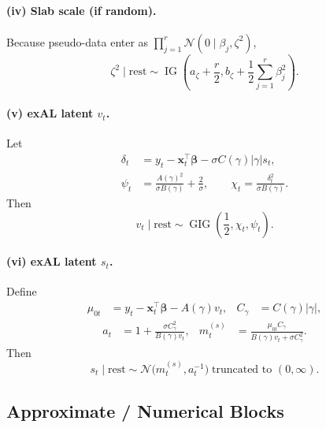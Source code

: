 \documentclass[11pt]{article}
\newcommand{\N}{\mathcal{N}}
\newcommand{\vect}[1]{\bm{#1}}
\DeclareMathOperator{\IG}{IG}
\DeclareMathOperator{\GIG}{GIG}
\begin{document}
\paragraph{(iv) Slab scale (if random).}
Because pseudo-data enter as
$\prod_{j=1}^r \N(0\mid\beta_j,\zeta^2)$,
\begin{equation}
  \zeta^2\mid\text{rest}
  \sim
  \IG\!\left(
    a_\zeta + \frac{r}{2},
    b_\zeta + \frac12\sum_{j=1}^r \beta_j^2
  \right).
  \label{eq:fc-zeta2}
\end{equation}

\paragraph{(v) exAL latent $v_t$.}
Let
\begin{align}
  \delta_t
  &= y_t - \vect{x}_t^\top\vect{\beta} - \sigma C(\gamma)|\gamma|s_t,
  \\
  \psi_t
  &= \frac{A(\gamma)^2}{\sigma B(\gamma)} + \frac{2}{\sigma},
  \qquad
  \chi_t = \frac{\delta_t^2}{\sigma B(\gamma)}.
\end{align}
Then
\begin{equation}
  v_t\mid\text{rest}
  \sim
  \GIG\!\left(\frac12,\chi_t,\psi_t\right).
  \label{eq:fc-v}
\end{equation}

\paragraph{(vi) exAL latent $s_t$.}
Define
\begin{align}
  \mu_{0t} &= y_t - \vect{x}_t^\top\vect{\beta} - A(\gamma)v_t,
  &
  C_\gamma &= C(\gamma)|\gamma|,
\end{align}
\begin{align}
  a_t &= 1 + \frac{\sigma C_\gamma^2}{B(\gamma)v_t},
  &
  m_t^{(s)} &= \frac{\mu_{0t}C_\gamma}{B(\gamma)v_t+\sigma C_\gamma^2}.
\end{align}
Then
\begin{equation}
  s_t\mid\text{rest}
  \sim
  \N\!\big(m_t^{(s)},a_t^{-1}\big)\;\text{truncated to }(0,\infty).
  \label{eq:fc-s}
\end{equation}

\subsection{Approximate / Numerical Blocks}
\end{document}
